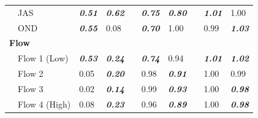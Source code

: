 \documentclass[letterpaper,12pt,oneside]{article}\usepackage[]{graphicx}\usepackage[]{color}
\begin{document}
\begin{table}[!tbp]
\begin{center}
\begin{tabular}{lllcllcll}
~~JAS&{\bf \textit{0.51}}&{\bf \textit{0.62}}&&{\bf \textit{0.75}}&{\bf \textit{0.80}}&&{\bf \textit{1.01}}&1.00\tabularnewline
~~OND&{\bf \textit{0.55}}&0.08&&{\bf \textit{0.70}}&1.00&&0.99&{\bf \textit{1.03}}\tabularnewline
\hline
{\bfseries Flow}&&&&&&&&\tabularnewline
~~Flow 1 (Low)&{\bf \textit{0.53}}&{\bf \textit{0.24}}&&{\bf \textit{0.74}}&0.94&&{\bf \textit{1.01}}&{\bf \textit{1.02}}\tabularnewline
~~Flow 2&0.05&{\bf \textit{0.20}}&&0.98&{\bf \textit{0.91}}&&1.00&0.99\tabularnewline
~~Flow 3&0.02&{\bf \textit{0.14}}&&0.99&{\bf \textit{0.93}}&&1.00&{\bf \textit{0.98}}\tabularnewline
~~Flow 4 (High)&0.08&{\bf \textit{0.23}}&&0.96&{\bf \textit{0.89}}&&1.00&{\bf \textit{0.98}}\tabularnewline
\hline
\end{tabular}\end{center}

\end{table}




\end{document}
